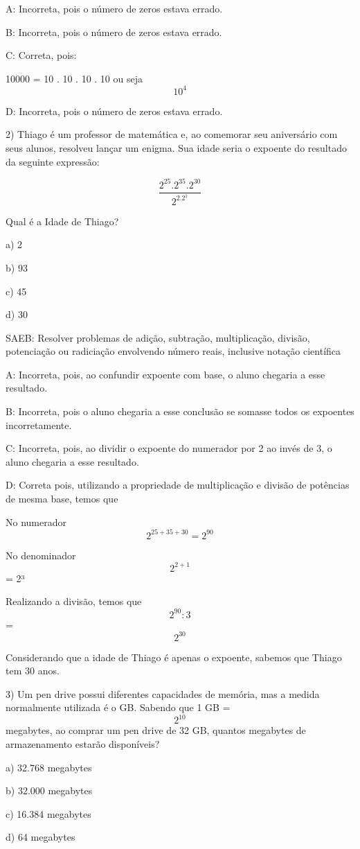 A: Incorreta, pois o número de zeros estava errado.

B: Incorreta, pois o número de zeros estava errado.

C: Correta, pois:

10000 = 10 . 10 . 10 . 10 ou seja \[10^4\]

D: Incorreta, pois o número de zeros estava errado.

2) Thiago é um professor de matemática e, ao comemorar seu aniversário
com seus alunos, resolveu lançar um enigma. Sua idade seria o expoente
do resultado da seguinte expressão:

\[\frac {2^{25}. 2^{35}. 2^{30}} {2^2.2^1}\]

Qual é a Idade de Thiago?

a) 2

b) 93

c) 45

d) 30

SAEB: Resolver problemas de adição, subtração, multiplicação, divisão,
potenciação ou radiciação envolvendo número reais, inclusive notação
científica

A: Incorreta, pois, ao confundir expoente com base, o aluno chegaria a
esse resultado.

B: Incorreta, pois o aluno chegaria a esse conclusão se somasse todos os
expoentes incorretamente.

C: Incorreta, pois, ao dividir o expoente do numerador por 2 ao invés de
3, o aluno chegaria a esse resultado.

D: Correta pois, utilizando a propriedade de multiplicação e divisão de
potências de mesma base, temos que

No numerador \[2^{25+35+30}=2^{90}\]

No denominador \[2^{2+1}\] = 2³

Realizando a divisão, temos que \[2^{90}:3\] = \[2^{30}\]

Considerando que a idade de Thiago é apenas o expoente, sabemos que
Thiago tem 30 anos.

3) Um pen drive possui diferentes capacidades de memória, mas a medida
normalmente utilizada é o GB. Sabendo que 1 GB = \[2^{10}\] megabytes,
ao comprar um pen drive de 32 GB, quantos megabytes de armazenamento
estarão disponíveis?

a) 32.768 megabytes

b) 32.000 megabytes

c) 16.384 megabytes

d) 64 megabytes

